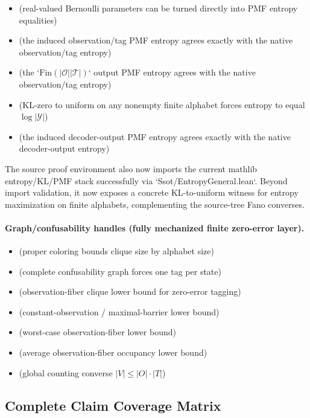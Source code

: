 \begin{itemize}
\item {} (real-valued Bernoulli parameters can be turned directly into PMF entropy equalities)
\item {} (the induced observation/tag PMF entropy agrees exactly with the native observation/tag entropy)
\item {} (the `$\mathrm{Fin}(|\mathcal O||\mathcal T|)$` output PMF entropy agrees with the native observation/tag entropy)
\item {} (KL-zero to uniform on any nonempty finite alphabet forces entropy to equal $\log |\mathcal Y|$)
\item {} (the induced decoder-output PMF entropy agrees exactly with the native decoder-output entropy)
\end{itemize}

The source proof environment also now imports the current mathlib entropy/KL/PMF stack successfully via `Ssot/EntropyGeneral.lean`. Beyond import validation, it now exposes a concrete KL-to-uniform witness for entropy maximization on finite alphabets, complementing the source-tree Fano converses.

\paragraph{Graph/confusability handles (fully mechanized finite zero-error layer).}
\begin{itemize}
\item {} (proper coloring bounds clique size by alphabet size)
\item {} (complete confusability graph forces one tag per state)
\item {} (observation-fiber clique lower bound for zero-error tagging)
\item {} (constant-observation / maximal-barrier lower bound)
\item {} (worst-case observation-fiber lower bound)
\item {} (average observation-fiber occupancy lower bound)
\item {} (global counting converse $|V|\le|O|\cdot|T|$)
\end{itemize}

\subsection*{Complete Claim Coverage Matrix}

